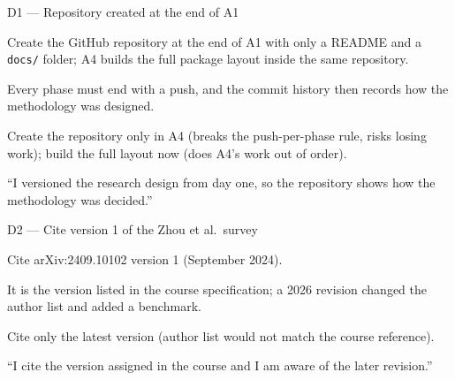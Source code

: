 \documentclass[11pt,a4paper]{report}
\begin{document}
\begin{decisionbox}{D1 --- Repository created at the end of A1}
\begin{description}[nosep, leftmargin=0pt]
  \item[Decision.] Create the GitHub repository at the end of A1 with only a
    README and a \texttt{docs/} folder; A4 builds the full package layout
    inside the same repository.
  \item[Why.] Every phase must end with a push, and the commit history then
    records how the methodology was designed.
  \item[Alternatives.] Create the repository only in A4 (breaks the
    push-per-phase rule, risks losing work); build the full layout now (does
    A4's work out of order).
  \item[Interview line.] ``I versioned the research design from day one, so
    the repository shows how the methodology was decided.''
\end{description}
\end{decisionbox}
\begin{decisionbox}{D2 --- Cite version 1 of the Zhou et al.\ survey}
\begin{description}[nosep, leftmargin=0pt]
  \item[Decision.] Cite arXiv:2409.10102 version 1 (September 2024).
  \item[Why.] It is the version listed in the course specification; a 2026
    revision changed the author list and added a benchmark.
  \item[Alternatives.] Cite only the latest version (author list would not
    match the course reference).
  \item[Interview line.] ``I cite the version assigned in the course and I am
    aware of the later revision.''
\end{description}
\end{decisionbox}
\end{document}
